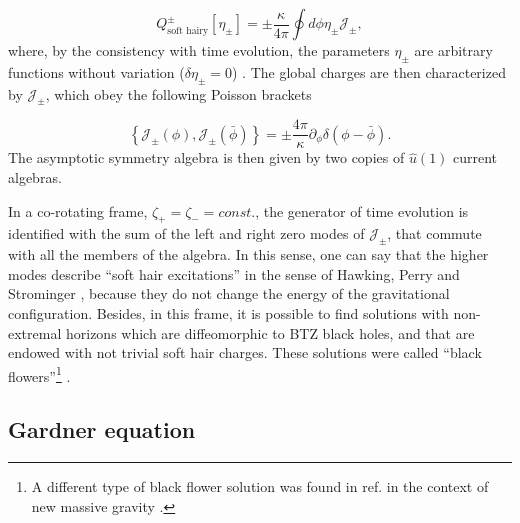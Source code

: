 \documentclass[letterpaper,11pt,oneside]{book}
\begin{document}
\[
Q_{\text{soft hairy}}^{\pm}\left[\eta_{\pm}\right]=\pm\frac{\kappa}{4\pi}\oint d\phi\eta_{\pm}\mathcal{J_{\pm}},
\]
where, by the consistency with time evolution, the parameters $\eta_{\pm}$
are arbitrary functions without variation ($\delta\eta_{\pm}=0$)
. The global charges are then characterized by $\mathcal{J_{\pm}}$,
which obey the following Poisson brackets

\begin{equation}
	\left\{ \mathcal{J_{\pm}}\left(\phi\right),\mathcal{J_{\pm}}\left(\bar{\phi}\right)\right\} =\pm\frac{4\pi}{\kappa}\partial_{\phi}\delta\left(\phi-\bar{\phi}\right).\label{eq:G-Poissonbracket}
\end{equation}
The asymptotic symmetry algebra is then given by two copies of $\hat{u}\left(1\right)$
current algebras.

In a co-rotating frame, $\zeta_{+}=\zeta_{-}=const.$, the generator
of time evolution is identified with the sum of the left and right
zero modes of $\mathcal{J_{\pm}}$, that commute with all the members
of the algebra. In this sense, one can say that the higher modes describe
``soft hair excitations'' in the sense of Hawking, Perry and Strominger
\cite{Hawking:2016msc,Hawking:2016sgy}, because they do not change
the energy of the gravitational configuration. Besides, in this frame,
it is possible to find solutions with non-extremal horizons which
are diffeomorphic to BTZ black holes, and that are endowed with not
trivial soft hair charges. These solutions were called ``black flowers''\footnote{A different type of black flower solution was found in ref. \cite{Barnich:2015dvt}
	in the context of new massive gravity \cite{Bergshoeff:2009hq,Bergshoeff:2009aq}.} \cite{Afshar:2016wfy,Afshar:2016kjj}.

\subsection{Gardner equation\label{sec:G-mixedmkdv}}
\end{document}
